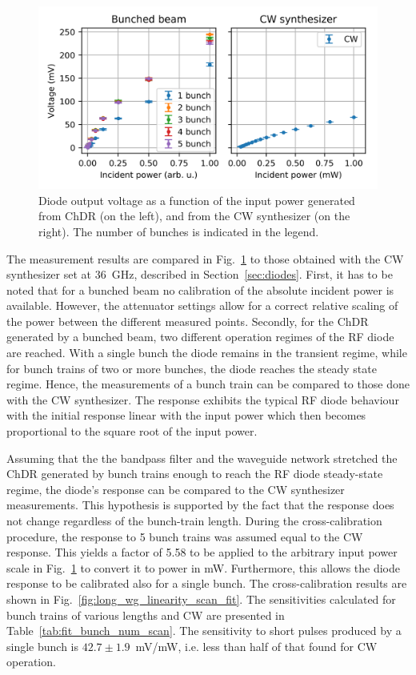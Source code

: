 \begin{figure}[!b]
\centering
\hspace{40mm}
\includegraphics[scale=1, keepaspectratio]{pictures/bunch_number_vs_CW}
\caption{Diode output voltage as a function of the input power generated from ChDR (on the left), and from the CW synthesizer (on the right). The number of bunches is indicated in the legend. }
\label{fig:long_wg_linearity_scan}
\end{figure}

The measurement results are compared in Fig.~\ref{fig:long_wg_linearity_scan} to those obtained with the CW synthesizer set at 36~GHz, described in Section~\ref{sec:diodes}. First, it has to be noted that for a bunched beam no calibration of the absolute incident power is available. However, the attenuator settings allow for a correct relative scaling of the power between the different measured points. Secondly, for the ChDR generated by a bunched beam, two different operation regimes of the RF diode are reached. With a single bunch the diode remains in the transient regime, while for bunch trains of two or more bunches, the diode reaches the steady state regime. Hence, the measurements of a bunch train can be compared to those done with the CW synthesizer. The response exhibits the typical RF diode behaviour with the initial response linear with the input power which then becomes proportional to the square root of the input power. 



Assuming that the the bandpass filter and the waveguide network stretched the ChDR generated by bunch trains enough to reach the RF diode steady-state regime, the diode's response can be compared to the CW synthesizer measurements. This hypothesis is supported by the fact that the response does not change regardless of the bunch-train length. During the cross-calibration procedure, the response to 5 bunch trains was assumed equal to the CW response. This yields a factor of 5.58 to be applied to the arbitrary input power scale in Fig.~\ref{fig:long_wg_linearity_scan} to convert it to power in mW. Furthermore, this allows the diode response to be calibrated also for a single bunch. The cross-calibration results are shown in Fig.~\ref{fig:long_wg_linearity_scan_fit}. The sensitivities calculated for bunch trains of various lengths and CW are presented in Table~\ref{tab:fit_bunch_num_scan}. The sensitivity to short pulses produced by a  single bunch is $42.7\pm1.9$~mV/mW, i.e. less than half of that found for CW operation. 


